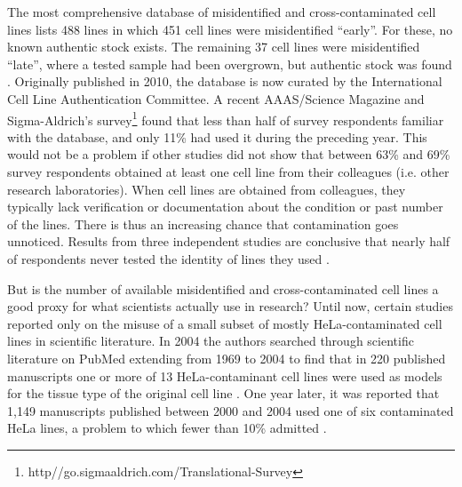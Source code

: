 \documentclass[12pt]{article}
\begin{document}
The most comprehensive database of misidentified and cross-contaminated cell lines lists 488 lines in which 451 cell lines were misidentified ``early''. For these, no known authentic stock exists. The remaining 37 cell lines were misidentified ``late'', where a tested sample had been overgrown, but authentic stock was found \cite{capes2010check}. Originally published in 2010, the database is now curated by the International Cell Line Authentication Committee. A recent AAAS/Science Magazine and Sigma-Aldrich's survey\footnote{http//go.sigmaaldrich.com/Translational-Survey} found that less than half of survey respondents  familiar with the database, and only 11\% had used it during the preceding year. This would not be a problem if other studies did not show that between 63\% \cite{buehring2004cell} and 69\% \cite{shannon2016cell} survey respondents obtained at least one cell line from their colleagues (i.e. other research laboratories). When cell lines are obtained from colleagues, they typically lack verification or documentation about the condition or past number of the lines. There is thus an increasing chance that contamination goes unnoticed. Results from three independent studies are conclusive that nearly half of respondents never tested the identity of lines they used \cite{buehring2004cell, shannon2016cell, freedman2014culture}.

But is the number of available misidentified and cross-contaminated cell lines a good proxy for what scientists actually use in research? Until now, certain studies reported only on the misuse of a small subset of mostly HeLa-contaminated cell lines in scientific literature. In 2004 the authors searched through scientific literature on PubMed extending from 1969 to 2004 to find that in 220 published manuscripts one or more of 13 HeLa-contaminant cell lines were used as models for the tissue type of the original cell line \cite{buehring2004cell}. One year later, it was reported that 1,149 manuscripts published between 2000 and 2004 used one of six contaminated HeLa lines, a problem to which fewer than 10\% admitted \cite{masters2005dna}.
\end{document}
